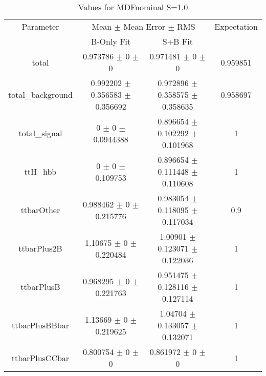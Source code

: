 \begin{table}
\centering
\caption{Values for MDFnominal S=1.0}
\begin{tabular}{cccc}
\toprule
Parameter & \multicolumn{2}{c}{Mean $\pm$ Mean Error $\pm$ RMS} & Expectation\\
 & B-Only Fit & S+B Fit & \\
\midrule
total & \num{0.973786} $\pm$ \num{0} $\pm$ \num{0} & \num{0.971481} $\pm$ \num{0} $\pm$ \num{0} & \num{0.959851}\\
total\_background & \num{0.992202} $\pm$ \num{0.356583} $\pm$ \num{0.356692} & \num{0.972896} $\pm$ \num{0.358575} $\pm$ \num{0.358635} & \num{0.958697}\\
total\_signal & \num{0} $\pm$ \num{0} $\pm$ \num{0.0944388} & \num{0.896654} $\pm$ \num{0.102292} $\pm$ \num{0.101968} & \num{1}\\
ttH\_hbb & \num{0} $\pm$ \num{0} $\pm$ \num{0.109753} & \num{0.896654} $\pm$ \num{0.111448} $\pm$ \num{0.110608} & \num{1}\\
ttbarOther & \num{0.988462} $\pm$ \num{0} $\pm$ \num{0.215776} & \num{0.983054} $\pm$ \num{0.118095} $\pm$ \num{0.117034} & \num{0.9}\\
ttbarPlus2B & \num{1.10675} $\pm$ \num{0} $\pm$ \num{0.220484} & \num{1.00901} $\pm$ \num{0.123071} $\pm$ \num{0.122036} & \num{1}\\
ttbarPlusB & \num{0.968295} $\pm$ \num{0} $\pm$ \num{0.221763} & \num{0.951475} $\pm$ \num{0.128116} $\pm$ \num{0.127114} & \num{1}\\
ttbarPlusBBbar & \num{1.13669} $\pm$ \num{0} $\pm$ \num{0.219625} & \num{1.04704} $\pm$ \num{0.133057} $\pm$ \num{0.132071} & \num{1}\\
ttbarPlusCCbar & \num{0.800754} $\pm$ \num{0} $\pm$ \num{0} & \num{0.861972} $\pm$ \num{0} $\pm$ \num{0} & \num{1}\\
\bottomrule
\end{tabular}
\end{table}
